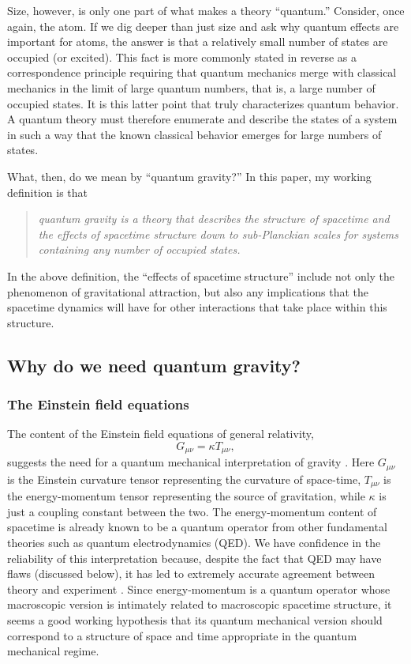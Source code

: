\documentclass[aps,amssymb,12pt]{revtex4-2}
\begin{document}
Size, however, is only one part of what makes a theory ``quantum.''
Consider, once again, the atom. If we dig deeper than just size and ask why
quantum effects are important for atoms, the answer is that a relatively
small number of states are occupied (or excited). This fact is more commonly
stated in reverse as a correspondence principle requiring that quantum
mechanics merge with classical mechanics in the limit of large quantum
numbers, that is, a large number of occupied states. It is this latter point
that truly characterizes quantum behavior. A quantum theory must therefore
enumerate and describe the states of a system in such a way that the known
classical behavior emerges for large numbers of states.

What, then, do we mean by ``quantum gravity?'' In this paper, my working
definition is that

\begin{quotation}
{\it quantum gravity is a theory that describes the structure of spacetime
and the effects of spacetime structure down to sub-Planckian scales for
systems containing any number of occupied states.}
\end{quotation}

\noindent In the above definition, the ``effects of spacetime structure''
include not only the phenomenon of gravitational attraction, but also any
implications that the spacetime dynamics will have for other interactions
that take place within this structure.

\subsection{Why do we need quantum gravity?}

\subsubsection{The Einstein field equations}

The content of the Einstein field equations of general relativity,
\begin{equation}
G_{\mu \nu }=\kappa T_{\mu \nu },  \label{2}
\end{equation}
suggests the need for a quantum mechanical interpretation of gravity \cite{8}.
Here $G_{\mu \nu }$ is the Einstein curvature tensor representing the
curvature of space-time, $T_{\mu \nu }$ is the energy-momentum tensor
representing the source of gravitation, while $\kappa $ is just a coupling
constant between the two. The energy-momentum content of spacetime is
already known to be a quantum operator from other fundamental theories such
as quantum electrodynamics (QED). We have confidence in the reliability of
this interpretation because, despite the fact that QED may have flaws
(discussed below), it has led to extremely accurate agreement between theory
and experiment \cite{9}. Since energy-momentum is a quantum operator whose
macroscopic version is intimately related to macroscopic spacetime
structure, it seems a good working hypothesis that its quantum mechanical
version should correspond to a structure of space and time appropriate in
the quantum mechanical regime.
\end{document}
